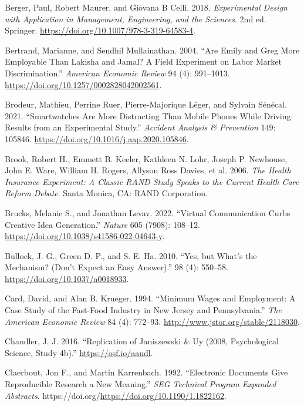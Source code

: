 \documentclass[
  11pt,
  letterpaper,
]{scrbook}
\newlength{\cslhangindent}
\newenvironment{CSLReferences}[2] %
 {\begin{list}{}{%
  \setlength{\itemindent}{0pt}
  \setlength{\leftmargin}{0pt}
  \setlength{\parsep}{0pt}
  \ifodd #1
   \setlength{\leftmargin}{\cslhangindent}
   \setlength{\itemindent}{-1\cslhangindent}
  \fi
  \setlength{\itemsep}{#2\baselineskip}}}
 {\end{list}}
\theoremstyle{definition}
\theoremstyle{definition}
\theoremstyle{remark}
\begin{document}
\begin{CSLReferences}{1}{0}
Berger, Paul, Robert Maurer, and Giovana B Celli. 2018.
\emph{Experimental Design with Application in Management, Engineering,
and the Sciences}. 2nd ed. Springer.
\url{https://doi.org/10.1007/978-3-319-64583-4}.

Bertrand, Marianne, and Sendhil Mullainathan. 2004. {``Are {E}mily and
{G}reg More Employable Than {L}akisha and {J}amal? A Field Experiment on
Labor Market Discrimination.''} \emph{American Economic Review} 94 (4):
991--1013. \url{https://doi.org/10.1257/0002828042002561}.

Brodeur, Mathieu, Perrine Ruer, Pierre-Majorique Léger, and Sylvain
Sénécal. 2021. {``Smartwatches Are More Distracting Than Mobile Phones
While Driving: Results from an Experimental Study.''} \emph{Accident
Analysis \& Prevention} 149: 105846.
\url{https://doi.org/10.1016/j.aap.2020.105846}.

Brook, Robert H., Emmett B. Keeler, Kathleen N. Lohr, Joseph P.
Newhouse, John E. Ware, William H. Rogers, Allyson Ross Davies, et al.
2006. \emph{The {H}ealth {I}nsurance {E}xperiment: A Classic {RAND}
Study Speaks to the Current Health Care Reform Debate}. Santa Monica,
CA: RAND Corporation.

Brucks, Melanie S., and Jonathan Levav. 2022. {``Virtual Communication
Curbs Creative Idea Generation.''} \emph{Nature} 605 (7908): 108--12.
\url{https://doi.org/10.1038/s41586-022-04643-y}.

Bullock, J. G., Green D. P., and S. E. Ha. 2010. {``Yes, but What's the
Mechanism? (Don't Expect an Easy Answer).''} 98 (4): 550--58.
\url{https://doi.org/10.1037/a0018933}.

Card, David, and Alan B. Krueger. 1994. {``Minimum Wages and Employment:
A Case Study of the Fast-Food Industry in {N}ew {J}ersey and
{P}ennsylvania.''} \emph{The American Economic Review} 84 (4): 772--93.
\url{http://www.jstor.org/stable/2118030}.

Chandler, J. J. 2016. {``Replication of {J}aniszewski \& {U}y (2008,
{P}sychological {S}cience, Study 4b).''} \url{https://osf.io/aaudl}.

Claerbout, Jon F., and Martin Karrenbach. 1992. {``Electronic Documents
Give Reproducible Research a New Meaning.''} \emph{SEG Technical Program
Expanded Abstracts}.
https://doi.org/\url{https://doi.org/10.1190/1.1822162}.


\end{CSLReferences}
\end{document}
